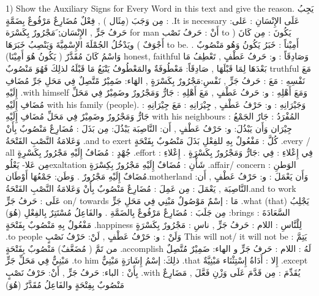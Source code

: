 \documentclass[a4paper]{article}
\begin{document}
\begin{flushright}
‏1) Show the Auxiliary Signs for Every Word in this text and give the reason.
يَجِبُ : مِن وَجَبَ (مِثَال ) , فِعْلٌ مُضَارِعٌ مَرْفُوعٌ بِضَمَّةٍ .It is necessary
عَلَى الإِنْسَانِ : عَلى: حَرفُ جَرٍّ , الإِنْسَان:ِ َمَجْرُورٌ بِكَسْرَة  for man
أَنْ : حَرفُ نَصْب to
يَكُونَ : مِن كَانَ ( أَجْوَفٌ ) ويَدْخُلُ الجُمْلَةَ الإِسْمِيَّةَ وَيَنْصِبُ خَبَرَهَا to be.
أَمِيْناً : خَبَرُ يَكُونُ وَهُو مَنْصُوبٌ . وَاسْمُ كَانَ مُقَدَّرٌ ( يَكُونُ هُوَ أَمِيْنَا) honest, faithful
وَصَادِقَاً : و: حَرفُ عَطْفٍ , تَعْطِفُ مَا بَعْدَهَا لِمَا قَبْلَهَا , صَادِقَاً: مَعْطُوفَةٌ
            والمَعْطُوفُ يَتْبَعُ مَا قَبْلَهُ لذلِكَ فَهُوَ مَنْصُوبٌ  truthful
مَعَ نَفْسِهِ : مَعَ : حَرفُ جَرٍّ , نَفْسِ:مَجْرُورٌ بِكَسْرَةٍ , الهَاء: ضَمِيْرٌ مًتَّصِلٌ
            فِي مَحَلِ جَرِّ مُضَافِ إِلَيْهِ .with himself
وَمَعَ أَهْلِهِ : و: حَرفُ عَطْفٍ , مَعَ أَهْلِهِ : جَارٌّ وَمَجْرُورٌ وضَمِيْرٌ فِي مَحَلِّ
            مُضَافِ إِلَيْهِ with his family (people).
وَجَيْرَانِهِ : و: حَرْفُ عَطْفٍ , جِِيْرَانِهِ : مَعَ جِيْرَانِهِ : جَارٌّ وَمَجْرُورٌ
                وضَمِيْرٌ فِي مَحَلِّ مُضَافِ إِلَيْهِ with his neighbours      
                المُفْرَدُ : جَارٌ       الجَمْعُ : جِيْرَان
وَأَن يَبْذُلَ: و: حَرْفُ عَطْفٍ , أَن: النَّاصِبَة      يَبْذُلَ: مِن بَذَلَ : مُضَارِعٌ
            مَنْصُوبٌ بِأَنْ وَعَلامَةُ النَّصْبِ الفَتْحَةُ .and to exert
كُلَّ :          مَفْعُولٌ بِهِ للفِعْلِ بَذَلَ مَنْصُوبٌ بِفَتْحَةٍ .every / all
جُهْدٍ : مُضَافُ إِلَيْهِ مَجْرُورٌ بِكَسْرِةٍ .effort
فِي إِعْلاءِ : فِي :جَارٌّ وَمَجْرُورٌ بِكَسْرَةٍ . إِعْلاءِ : مِن عَلا- يَعْلُوexaltation
شَأْنِ : مُضَافٌ إِلَيْهِ مَجْرُورٌ بِكِسْرَةٍ .affair/ concern
الوَطنِ : مُضَافٌ إِلَيْهِ مَجْرُورٌ . وَطَن: جَمْعُهَا أَوْطَان.motherland
وَأَن يَعْمَلَ : و: حَرْفُ عَطْفٍ , أَن: النَّاصِبَة , يَعْمَلَ : مِن عَمِلَ : مُضَارِعٌ
            مَنْصُوبٌ بِأَنْ وَعَلامَةُ النَّصْبِ الفَتْحَةُ.and to work
عَلَى : حَرفُ جَرٍّ on/ towards
مَا : إسْمٌ مَوْصُولٌ مَبْنِي فِي مَحَلِ جَرٍّ .what (that)
يَجْلِبُ : مِن جَلَبَ : مُضَارِعٌ مَرْفُوعٌ بِالضَمَّةِ . والفَاعِلُ مُسْتَتِرٌ بِالفِعْلِ (هُوَ)brings
السَّعَادَةَ : مَفْعُولٌ بِهِ مَنْصُوبٌ بِفَتْحَةٍ .happiness
لِلْنَّاسِ : اللام : حَرفُ جَرٍّ ,  ناسِ : مَجْرُورٌ بِكَسْرَةٍ .to people
وَلَنْ : و: حَرْفُ عَطْفٍ ,  لَنْ: حَرْفُ نَصْبٍ This will not/ it will not be
يَتِمَّ : من تَمَّ ( مُضَعَّفٌ) مَنْصُوبٌ بِفَتْحَةٍ .accomplish
لَهُ : اللام : حَرفُ جَرٍّ  و الهاء: ضَمِيْرٌ مُتَّصِلٌ مَبْنِيٌّ فِي مَحَلِّ جَرٍّ .to him
ذلِكَ: إسْمُ إِشَارَةٍ مَبْنِيٌّ .that
إِلا : أَدَاةُ إِسْتِثْنَاء مَبْنِيَّةٌ .except
بِأَنْ : الباء: حَرفُ جَرٍّ ,  أَنْ: حَرْفُ نَصْبٍ .with
يُقَدِّمَ : مِن قَدَّمَ عَلَى وَزْنِ فَعَّلَ , مَضَارِعٌ مَنْصُوبٌ بِفِتْحَةٍ والفَاعِلُ مُقَدَّرٌ (هُوَ)

\end{flushright}
\end{document}
